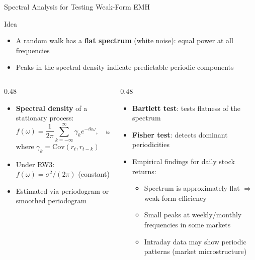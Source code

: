 \documentclass[9pt, aspectratio=169, t]{beamer}
\theoremstyle{definition}
\newenvironment{cminipage}[1]{%
    \par\noindent\hfill\begin{minipage}{#1}\ignorespaces
}{%
    \end{minipage}\hfill\null\par
}
\newcommand{\Cov}{\text{Cov}}
\begin{document}
\begin{frame}{Spectral Analysis for Testing Weak-Form EMH}
\begin{cminipage}{0.95\textwidth}
\begin{block}{Idea}
\begin{itemize}\setlength{\itemsep}{0pt}
    \item A random walk has a \textbf{flat spectrum} (white noise): equal power at all frequencies
    \item Peaks in the spectral density indicate predictable periodic components
\end{itemize}
\end{block}

\begin{columns}[T]
\begin{column}{0.48\textwidth}
\begin{itemize}\setlength{\itemsep}{0pt}
    \item \textbf{Spectral density} of a stationary process:
    $$f(\omega) = \frac{1}{2\pi}\sum_{k=-\infty}^{\infty}\gamma_k e^{-ik\omega}, \quad \omega \in [-\pi, \pi]$$
    where $\gamma_k = \Cov(r_t, r_{t-k})$
    \item Under RW3: $f(\omega) = \sigma^2/(2\pi)$ (constant)
    \item Estimated via periodogram or smoothed periodogram
\end{itemize}
\end{column}
\begin{column}{0.48\textwidth}
\begin{itemize}\setlength{\itemsep}{0pt}
    \item \textbf{Bartlett test}: tests flatness of the spectrum
    \item \textbf{Fisher test}: detects dominant periodicities
    \item Empirical findings for daily stock returns:
    \begin{itemize}\setlength{\itemsep}{0pt}
        \item Spectrum is approximately flat $\Rightarrow$ weak-form efficiency
        \item Small peaks at weekly/monthly frequencies in some markets
        \item Intraday data may show periodic patterns (market microstructure)
    \end{itemize}
\end{itemize}
\end{column}
\end{columns}
\end{cminipage}
\end{frame}
\end{document}
